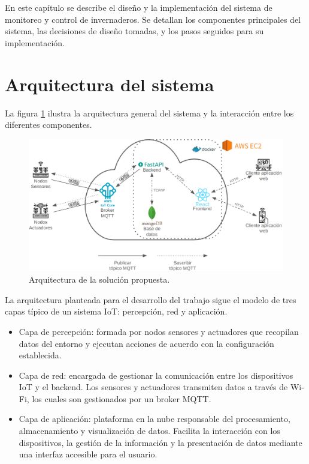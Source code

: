 \label{Chapter3} %

En este capítulo se describe el diseño y la implementación del sistema de
monitoreo y control de invernaderos. Se detallan los componentes principales
del sistema, las decisiones de diseño tomadas, y los pasos seguidos para su
implementación.

\section{Arquitectura del sistema}

La figura \ref{fig:arquitectura} ilustra la arquitectura general del sistema y
la interacción entre los diferentes componentes.

\begin{figure}[H]
    \centering
    \includegraphics[width=.99\textwidth]{./Images/14.png}
    \caption{Arquitectura de la solución propuesta.}
    \label{fig:arquitectura}
\end{figure}

La arquitectura planteada para el desarrollo del trabajo sigue el modelo de
tres capas típico de un sistema IoT: percepción, red y aplicación.

\begin{itemize}
    \item Capa de percepción: formada por nodos sensores y actuadores que recopilan datos
          del entorno y ejecutan acciones de acuerdo con la configuración establecida.
    \item Capa de red: encargada de gestionar la comunicación entre los dispositivos IoT
          y el backend. Los sensores y actuadores transmiten datos a través de Wi-Fi, los
          cuales son gestionados por un broker MQTT.
    \item Capa de aplicación: plataforma en la nube responsable del procesamiento,
          almacenamiento y visualización de datos. Facilita la interacción con los
          dispositivos, la gestión de la información y la presentación de datos mediante
          una interfaz accesible para el usuario.
\end{itemize}

